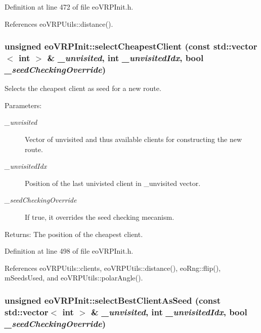 Definition at line 472 of file eo\-VRPInit.h.

References eo\-VRPUtils::distance().
\subsubsection{\setlength{\rightskip}{0pt plus 5cm}unsigned eo\-VRPInit::select\-Cheapest\-Client (const std::vector$<$ int $>$ \& {\em \_\-unvisited}, int {\em \_\-unvisited\-Idx}, bool {\em \_\-seed\-Checking\-Override})\hspace{0.3cm}{\tt  [inline, private]}}\label{classeo_v_r_p_init_0bb48de33e92c2b6a386e28d5b759f4b}


Selects the cheapest client as seed for a new route. 

\begin{Desc}
\item[Parameters:]
\begin{description}
\item[{\em \_\-unvisited}]Vector of unvisited and thus available clients for constructing the new route. \item[{\em \_\-unvisited\-Idx}]Position of the last univisted client in \_\-unvisited vector. \item[{\em \_\-seed\-Checking\-Override}]If true, it overrides the seed checking mecanism. \end{description}
\end{Desc}
\begin{Desc}
\item[Returns:]The position of the cheapest client. \end{Desc}


Definition at line 498 of file eo\-VRPInit.h.

References eo\-VRPUtils::clients, eo\-VRPUtils::distance(), eo\-Rng::flip(), m\-Seeds\-Used, and eo\-VRPUtils::polar\-Angle().
\subsubsection{\setlength{\rightskip}{0pt plus 5cm}unsigned eo\-VRPInit::select\-Best\-Client\-As\-Seed (const std::vector$<$ int $>$ \& {\em \_\-unvisited}, int {\em \_\-unvisited\-Idx}, bool {\em \_\-seed\-Checking\-Override})\hspace{0.3cm}{\tt  [inline, private]}}\label{classeo_v_r_p_init_dd681a23869f69438120ee2d82f85e94}



